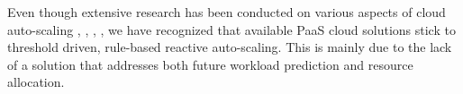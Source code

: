 Even though extensive research has been conducted on various aspects of cloud auto-scaling \cite{Islam_2012}, \cite{Zhenhuan_Gong_2010}, \cite{Moore_2013}, \cite{reviewofautoscaling}, we have recognized that available PaaS cloud solutions stick to threshold driven, rule-based reactive auto-scaling. This is mainly due to the lack of a solution that addresses both future workload prediction and resource allocation.